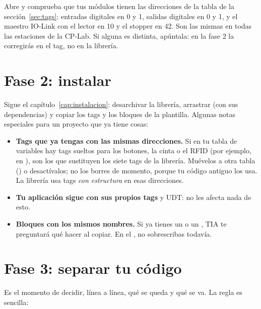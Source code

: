 Abre  y comprueba que tus módulos tienen las direcciones de la tabla de la sección~\ref{sec:tags}: entradas digitales en 0 y 1, salidas digitales en 0 y 1, y el maestro IO-Link con el lector en 10 y el stopper en 42. Son las mismas en todas las estaciones de la CP-Lab. Si alguna es distinta, apúntala: en la fase 2 la corregirás en el tag, no en la librería.


\section{Fase 2: instalar}
Sigue el capítulo~\ref{cap:instalacion}: desarchivar la librería, arrastrar  (con sus dependencias) y copiar los tags y los bloques de la plantilla. Algunas notas especiales para un proyecto que ya tiene cosas:

\begin{itemize}
\item \textbf{Tags que ya tengas con las mismas direcciones.} Si en tu tabla de variables hay tags sueltos para los botones, la cinta o el RFID (por ejemplo,  en ), son los que sustituyen los siete tags de la librería. Muévelos a otra tabla () o desactívalos; no los borres de momento, porque tu código antiguo los usa. La librería usa tags \emph{con estructura} en esas direcciones.
\item \textbf{Tu aplicación sigue con sus propios tags} y UDT: no les afecta nada de esto.
\item \textbf{Bloques con los mismos nombres.} Si ya tienes un  o un , TIA te preguntará qué hacer al copiar. En el , no sobrescribas todavía.
\end{itemize}


\section{Fase 3: separar tu código}\label{sec:separar}
Es el momento de decidir, línea a línea, qué se queda y qué se va. La regla es sencilla:

